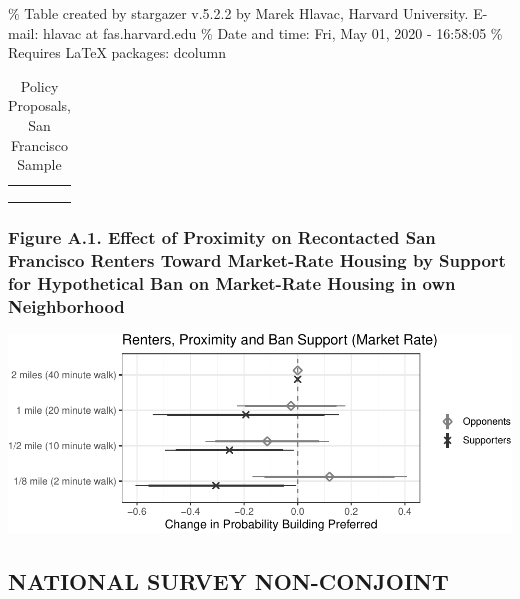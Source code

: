 \documentclass[]{article}
\begin{document}
\% Table created by stargazer v.5.2.2 by Marek Hlavac, Harvard University. E-mail: hlavac at fas.harvard.edu
\% Date and time: Fri, May 01, 2020 - 16:58:05
\% Requires LaTeX packages: dcolumn

\begin{table}[H] \centering 
  \caption{Policy Proposals, San Francisco Sample} 
  \label{sf_policies} 
\small 
\begin{tabular}{@{\extracolsep{5pt}} D{.}{.}{-2} } 
\\[-1.8ex]\hline 
\hline \\[-1.8ex] 
 \\ 
\hline \\[-1.8ex] 
\end{tabular} 
\end{table}

\hypertarget{figure-a.1.-effect-of-proximity-on-recontacted-san-francisco-renters-toward-market-rate-housing-by-support-for-hypothetical-ban-on-market-rate-housing-in-own-neighborhood}{%
\subsubsection{Figure A.1. Effect of Proximity on Recontacted San Francisco Renters Toward Market-Rate Housing by Support for Hypothetical Ban on Market-Rate Housing in own Neighborhood}\label{figure-a.1.-effect-of-proximity-on-recontacted-san-francisco-renters-toward-market-rate-housing-by-support-for-hypothetical-ban-on-market-rate-housing-in-own-neighborhood}}

\includegraphics{Zheng-Ruth-Renters-Paper_files/figure-latex/Figure A.1 print-1.pdf}

\hypertarget{national-survey-non-conjoint}{%
\subsection{NATIONAL SURVEY NON-CONJOINT}\label{national-survey-non-conjoint}}
\end{document}
